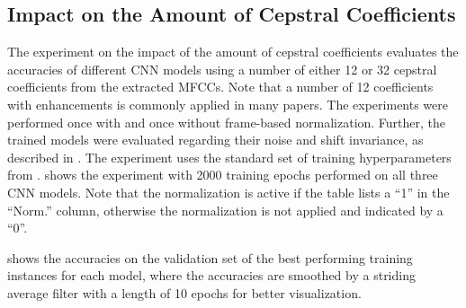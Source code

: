 \subsection{Impact on the Amount of Cepstral Coefficients}
The experiment on the impact of the amount of cepstral coefficients evaluates the accuracies of different CNN models using a number of either 12 or 32 cepstral coefficients from the extracted MFCCs.
Note that a number of 12 coefficients with enhancements is commonly applied in many papers.
The experiments were performed once with and once without frame-based normalization.
Further, the trained models were evaluated regarding their noise and shift invariance, as described in .
The experiment uses the standard set of training hyperparameters from .
 shows the experiment with 2000 training epochs performed on all three CNN models.
Note that the normalization is active if the table lists a \enquote{1} in the \enquote{Norm.} column, otherwise the normalization is not applied and indicated by a \enquote{0}.

 shows the accuracies on the validation set of the best performing training instances for each model, where the accuracies are smoothed by a striding average filter with a length of 10 epochs for better visualization.
